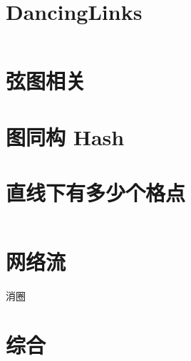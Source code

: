 \documentclass[titlepage,landscape,a4paper,10pt]{article}
\begin{document}
\begin{multicols}{2}
\begin{spacing}{0.8}
\section{DancingLinks}
\inputminted{cpp}{src/DancingLinks.cpp}
%

\section{弦图相关}


\section{图同构 Hash}



\section{直线下有多少个格点}
\inputminted{cpp}{src/直线下格点统计.cpp}

\section{网络流}
消圈

\section{综合}






\end{spacing}
\end{multicols}
\end{document}
